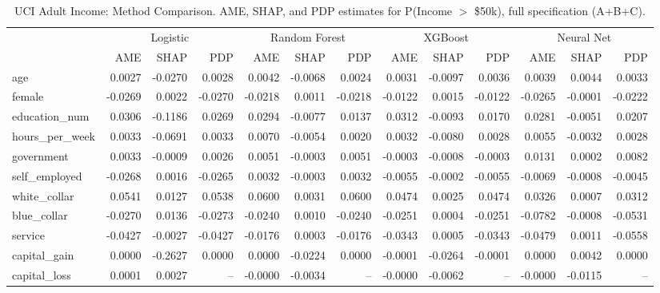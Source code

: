 \documentclass[conference]{IEEEtran}
\begin{document}
	\begin{table}[htbp]
		\centering
		\footnotesize
		\begin{threeparttable}
			\caption{UCI Adult Income: Method Comparison. AME, SHAP, and PDP estimates for P(Income $>$ \$50k), full specification (A+B+C).}
			\label{tab:adult_method_comparison}
			\begin{tabular}{lrrrrrrrrrrrr}
				\toprule
				& \multicolumn{3}{c}{Logistic} & \multicolumn{3}{c}{Random Forest} & \multicolumn{3}{c}{XGBoost} & \multicolumn{3}{c}{Neural Net} \\
				\cmidrule(lr){2-4} \cmidrule(lr){5-7} \cmidrule(lr){8-10} \cmidrule(lr){11-13}
				& AME & SHAP & PDP & AME & SHAP & PDP & AME & SHAP & PDP & AME & SHAP & PDP \\
				\midrule
				age & 0.0027 & -0.0270 & 0.0028 & 0.0042 & -0.0068 & 0.0024 & 0.0031 & -0.0097 & 0.0036 & 0.0039 & 0.0044 & 0.0033 \\
				female & -0.0269 & 0.0022 & -0.0270 & -0.0218 & 0.0011 & -0.0218 & -0.0122 & 0.0015 & -0.0122 & -0.0265 & -0.0001 & -0.0222 \\
				education\_num & 0.0306 & -0.1186 & 0.0269 & 0.0294 & -0.0077 & 0.0137 & 0.0312 & -0.0093 & 0.0170 & 0.0281 & -0.0051 & 0.0207 \\
				\midrule
				hours\_per\_week & 0.0033 & -0.0691 & 0.0033 & 0.0070 & -0.0054 & 0.0020 & 0.0032 & -0.0080 & 0.0028 & 0.0055 & -0.0032 & 0.0028 \\
				government & 0.0033 & -0.0009 & 0.0026 & 0.0051 & -0.0003 & 0.0051 & -0.0003 & -0.0008 & -0.0003 & 0.0131 & 0.0002 & 0.0082 \\
				self\_employed & -0.0268 & 0.0016 & -0.0265 & 0.0032 & -0.0003 & 0.0032 & -0.0055 & -0.0002 & -0.0055 & -0.0069 & -0.0008 & -0.0045 \\
				white\_collar & 0.0541 & 0.0127 & 0.0538 & 0.0600 & 0.0031 & 0.0600 & 0.0474 & 0.0025 & 0.0474 & 0.0326 & 0.0007 & 0.0312 \\
				blue\_collar & -0.0270 & 0.0136 & -0.0273 & -0.0240 & 0.0010 & -0.0240 & -0.0251 & 0.0004 & -0.0251 & -0.0782 & -0.0008 & -0.0531 \\
				service & -0.0427 & -0.0027 & -0.0427 & -0.0176 & 0.0003 & -0.0176 & -0.0343 & 0.0005 & -0.0343 & -0.0479 & 0.0011 & -0.0558 \\
				\midrule
				capital\_gain & 0.0000 & -0.2627 & 0.0000 & 0.0000 & -0.0224 & 0.0000 & -0.0001 & -0.0264 & -0.0001 & 0.0000 & 0.0042 & 0.0000 \\
				capital\_loss & 0.0001 & 0.0027 & -- & -0.0000 & -0.0034 & -- & -0.0000 & -0.0062 & -- & -0.0000 & -0.0115 & -- \\

\end{tabular}
\end{threeparttable}
\end{table}
\end{document}
